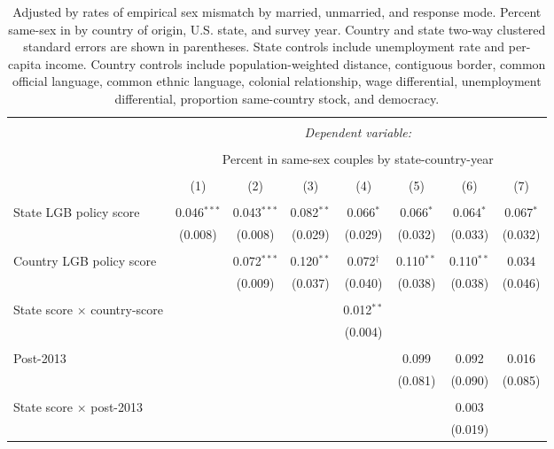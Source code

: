 \documentclass[
  11pt,
]{article}
\begin{document}
\begin{table}[!htbp] \centering 
  \caption{Adjusted by rates of empirical sex mismatch by married, unmarried, and response mode. Percent same-sex in by country of origin, U.S. state, and survey year. Country and state two-way clustered standard errors are shown in parentheses. State controls include unemployment rate and per-capita income. Country controls include population-weighted distance, contiguous border, common official language, common ethnic language, colonial relationship, wage differential, unemployment differential, proportion same-country stock, and democracy.} 
  \label{tab:state-props-adj} 
\begin{tabular}{@{\extracolsep{5pt}}lccccccc} 
\\[-1.8ex]\hline 
\hline \\[-1.8ex] 
 & \multicolumn{7}{c}{\textit{Dependent variable:}} \\ 
\cline{2-8} 
\\[-1.8ex] & \multicolumn{7}{c}{Percent in same-sex couples by state-country-year} \\ 
\\[-1.8ex] & (1) & (2) & (3) & (4) & (5) & (6) & (7)\\ 
\hline \\[-1.8ex] 
 State LGB policy score & 0.046$^{***}$ & 0.043$^{***}$ & 0.082$^{**}$ & 0.066$^{*}$ & 0.066$^{*}$ & 0.064$^{*}$ & 0.067$^{*}$ \\ 
  & (0.008) & (0.008) & (0.029) & (0.029) & (0.032) & (0.033) & (0.032) \\ 
  & & & & & & & \\ 
 Country LGB policy score &  & 0.072$^{***}$ & 0.120$^{**}$ & 0.072$^{†}$ & 0.110$^{**}$ & 0.110$^{**}$ & 0.034 \\ 
  &  & (0.009) & (0.037) & (0.040) & (0.038) & (0.038) & (0.046) \\ 
  & & & & & & & \\ 
 State score × country-score &  &  &  & 0.012$^{**}$ &  &  &  \\ 
  &  &  &  & (0.004) &  &  &  \\ 
  & & & & & & & \\ 
 Post-2013 &  &  &  &  & 0.099 & 0.092 & 0.016 \\ 
  &  &  &  &  & (0.081) & (0.090) & (0.085) \\ 
  & & & & & & & \\ 
 State score × post-2013 &  &  &  &  &  & 0.003 &  \\ 
  &  &  &  &  &  & (0.019) &  \\ 

\end{tabular}
\end{table}
\end{document}
